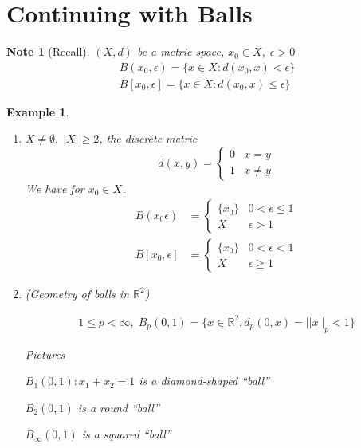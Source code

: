 \documentclass[11pt, oneside]{book}
\theoremstyle{break}
\newtheorem*{note}{Note}
\newtheorem{eg}{Example}[section]
\newcommand{\bb}[1]{\mathbb{#1}}			%
\begin{document}
\section{Continuing with Balls}\label{sect:balls cont}

\begin{note}[Recall]
	$(X, d)$ be a metric space, $x_0 \in X, \; \epsilon > 0$
	\begin{gather*}
		B(x_0, \epsilon) = \{x \in X : d(x_0, x) < \epsilon \} \\
		B[x_0, \epsilon] = \{x \in X : d(x_0, x) \leq \epsilon \}
	\end{gather*}
\end{note}

\begin{eg}
	\begin{enumerate}
		\item $X \neq \emptyset, \; |X| \geq 2$, the discrete metric
			\begin{equation*}
				d(x,y) = 
					\begin{cases}
						0 & x = y \\
						1 & x \neq y
					\end{cases}
			\end{equation*}
			We have for $x_0 \in X$,
			\begin{align*}
				B(x_0 \epsilon) &= 
					\begin{cases}
						\{x_0\} & 0 < \epsilon \leq 1 \\
						X & \epsilon > 1
					\end{cases} \\
				B[x_0, \epsilon] &=
					\begin{cases}
						\{x_0\} & 0 < \epsilon < 1 \\
						X & \epsilon \geq 1
					\end{cases}
			\end{align*}

		\item (Geometry of balls in $\bb{R}^2$)

			\begin{gather*}
				1 \leq p < \infty, \; B_p(0, 1) = \{x \in \bb{R}^2, d_p(0, x) = ||x||_p < 1 \}
			\end{gather*}

			Pictures

			$B_1(0, 1) : x_1 + x_2 = 1$ is a diamond-shaped ``ball''

			$B_2(0, 1)$ is a round ``ball''

			$B_\infty(0, 1)$ is a squared ``ball''


\end{enumerate}
\end{eg}
\end{document}
